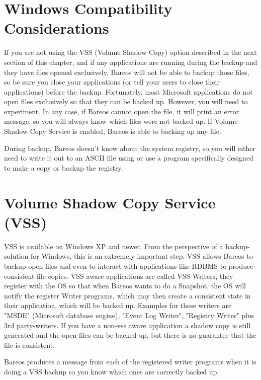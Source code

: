\section{Windows Compatibility Considerations}
\label{Compatibility}


If you are not using the VSS (Volume Shadow Copy) option described in the
next section of this chapter, and if any applications are running during
the backup and they have files opened exclusively, Bareos will not be able
to backup those files, so be sure you close your applications (or tell your
users to close their applications) before the backup.  Fortunately, most
Microsoft applications do not open files exclusively so that they can be
backed up.  However, you will need to experiment.  In any case, if Bareos
cannot open the file, it will print an error message, so you will always
know which files were not backed up.
If Volume Shadow Copy Service is enabled, Bareos is able to backing up any
file.

During backup, Bareos doesn't know about the system registry, so you will
either need to write it out to an ASCII file using  or use a
program specifically designed to make a copy or backup the registry.



\section{Volume Shadow Copy Service (VSS)}
\label{VSS}

VSS is available on Windows XP and newer. From the perspective of
a backup-solution for Windows, this is an extremely important step. VSS
allows Bareos to backup open files and even to interact with applications like
RDBMS to produce consistent file copies. VSS aware applications are called
VSS Writers, they register with the OS so that when Bareos wants to do a
Snapshot, the OS will notify the register Writer programs, which may then
create a consistent state in their application, which will be backed up.
Examples for these writers are "MSDE" (Microsoft database
engine), "Event Log Writer", "Registry Writer" plus 3rd
party-writers.  If you have a non-vss aware application a shadow copy is still generated
and the open files can be backed up, but there is no guarantee
that the file is consistent.

Bareos produces a message from each of the registered writer programs
when it is doing a VSS backup so you know which ones are correctly backed
up.

